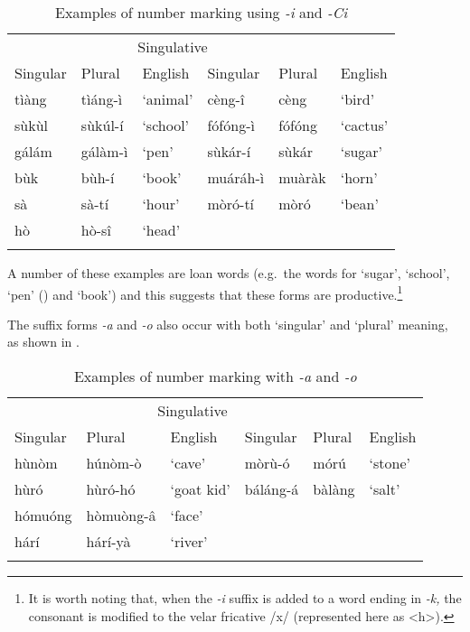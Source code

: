 \documentclass[output=paper]{langsci/langscibook}
\begin{document}
\begin{table}
\begin{tabularx}{\textwidth}{XXXXXX}
\lsptoprule

\multicolumn{3}{c}{ {Plurative}} & \multicolumn{3}{c}{ {Singulative}}\\ \cmidrule(lr){1-3}\cmidrule(lr){4-6}
 {Singular} & {Plural} & {English} & {Singular} & {Plural} & {English}\\ \midrule
 tìàng &  tìáng-ì & ‘animal’ &  cèng-î &  cèng & ‘bird’\\
 sùkùl &  sùkúl-í & ‘school’ &  fófóng-ì &  fófóng & ‘cactus’\\
 gálám &  gálàm-ì & ‘pen’ &  sùkár-í &  sùkár & ‘sugar’\\
 bùk &  bùh-í & ‘book’ &  muáráh-ì &  muàràk & ‘horn’\\
 sà &  sà-tí & ‘hour’ &  mòró-tí &  mòró & ‘bean’\\
 hò &  hò-sî & ‘head’ &  &  & \\
\lspbottomrule
\end{tabularx}
\caption{Examples of number marking using \textit{-i} and \textit{-Ci}}
\label{tab:moodie:10}
\end{table}

A number of these examples are loan words (e.g.\ the words for ‘sugar’, ‘school’, ‘pen’ () and ‘book’) and this suggests that these forms are productive.\footnote{It is worth noting that, when the \textit{-i} suffix is added to a word ending in \textit{-k,} the consonant is modified to the velar fricative /x/ (represented here as <h>).} 

The suffix forms \textit{-a }and \textit{-o} also occur with both `singular' and `plural' meaning, as shown in . 

\begin{table}
\begin{tabularx}{\textwidth}{XlXXXX}
\lsptoprule

\multicolumn{3}{c}{ {Plural}} & \multicolumn{3}{c}{ {Singulative}}\\ \cmidrule(lr){1-3}\cmidrule(lr){4-6}
 {Singular} & {Plural} & {English} & {Singular} & {Plural} & {English}\\ \midrule
 hùnòm &  húnòm-ò & ‘cave’ &  mòrù-ó &  mórú & ‘stone’\\
 hùró &  hùró-hó & ‘goat kid’ &  báláng-á &  bàlàng & ‘salt’\\
 hómuóng &  hòmuòng-\^{a} & ‘face’ &  &  & \\
 hárí &  hárí-yà & ‘river’ &  &  & \\
\lspbottomrule
\end{tabularx}
\caption{Examples of number marking with \textit{-a} and \textit{-o}} 
\label{tab:moodie:11}
\end{table}
\end{document}
